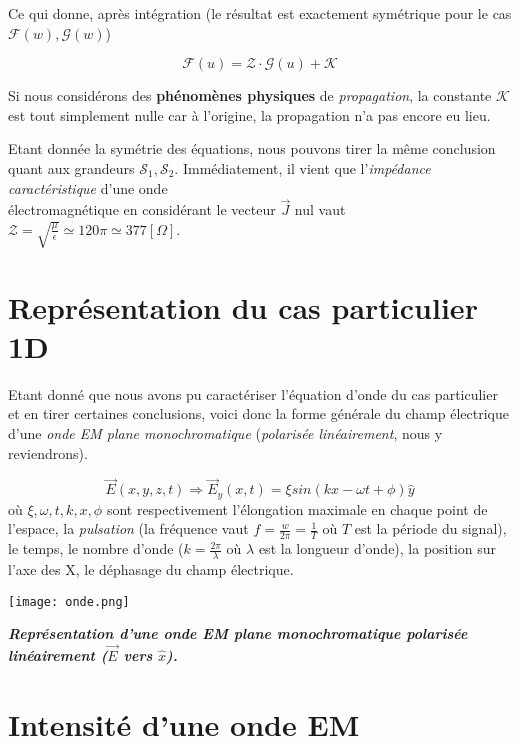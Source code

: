 Ce qui donne, après intégration (le résultat est exactement symétrique pour le cas $\mathcal{F}(w), \mathcal{G}(w)$) 

\[\mathcal{F}(u) = \mathcal{Z} \cdot \mathcal{G}(u) + \mathcal{K}\]

Si nous considérons des \textbf{phénomènes physiques} de \textit{propagation}, la constante $\mathcal{K}$ est tout simplement nulle car 
à l'origine, la propagation n'a pas encore eu lieu. 


Etant donnée la symétrie des équations, nous pouvons tirer la même conclusion quant aux grandeurs $\mathcal{S}_{1},\mathcal{S}_{2}$. 
Immédiatement, il vient que l'\textit{impédance caractéristique} d'une onde\\ électromagnétique en considérant le vecteur $\vec{J}$ nul vaut 
$\mathcal{Z} = \sqrt{\frac{\mu}{\epsilon}} \simeq120 \pi \simeq 377 [\Omega] $. 

\section{Représentation du cas particulier 1D}

Etant donné que nous avons pu caractériser l'équation d'onde du cas particulier et en tirer certaines conclusions, 
voici donc la forme générale du champ électrique d'une \textit{onde EM plane monochromatique} (\textit{polarisée linéairement}, nous y reviendrons).

\[\vec{E}(x,y,z,t) \Rightarrow \vec{E}_{y}(x,t) = \xi sin(k x - \omega t + \phi) \hat{y} \]
où $\xi,\omega,t,k,x,\phi$ sont respectivement l'élongation maximale en chaque point de l'espace, la \textit{pulsation} (la fréquence  vaut $f = \frac{w}{2 \pi} = \frac{1}{T}$ où $T$ 
est la période du signal), le temps, le nombre d'onde ($k = \frac{2\pi}{\lambda}$ où $\lambda$ est la longueur d'onde), la position sur l'axe des X, le déphasage  du champ électrique. 
\begin{marginfigure}
\texttt{[image: onde.png]}
\caption{\textit{\textbf{Représentation d'une onde EM plane monochromatique polarisée linéairement ($\vec{E}$ vers $\hat{x}$).}}}
\end{marginfigure}




\section{Intensité d'une onde EM}  %

